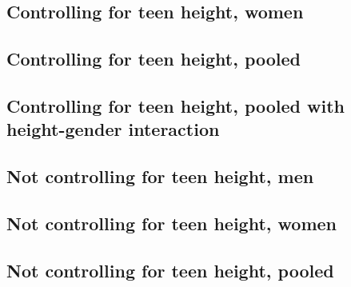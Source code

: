 \documentclass{article}
\begin{document}
\begin{landscape}
\subsection{Controlling for teen height, women}

\end{landscape}

\begin{landscape}
\subsection{Controlling for teen height, pooled}

\end{landscape}

\begin{landscape}
\subsection{Controlling for teen height, pooled with height-gender interaction}

\end{landscape}

\begin{landscape}
\subsection{Not controlling for teen height, men}

\end{landscape}

\begin{landscape}
\subsection{Not controlling for teen height, women}

\end{landscape}

\begin{landscape}
\subsection{Not controlling for teen height, pooled}

\end{landscape}
\end{document}

